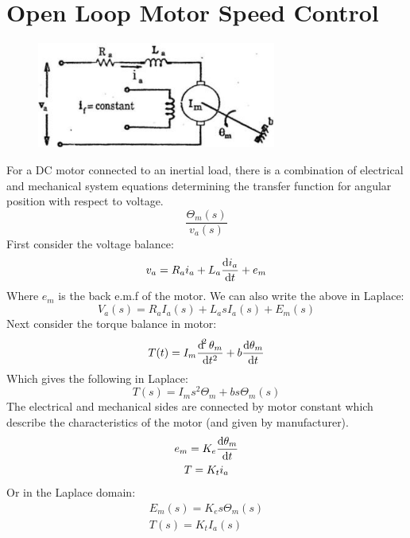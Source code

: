 \documentclass[class=report, crop=false, 12pt,a4paper, tikz, border=4mm]{standalone}
\begin{document}
\section{Open Loop Motor Speed Control}
\begin{figure}[H]
  \centering
  \includegraphics[width = 0.7\textwidth]{../img/diagram37.png}
\end{figure}
For a DC motor connected to an inertial load, there is a combination of electrical and mechanical system equations determining the transfer function for angular position with respect to voltage.
\begin{equation}
  \frac{\Theta_m (s)}{v_a(s)}
\end{equation}
First consider the voltage balance:
\begin{equation}
  v_a = R_a i_a + L_a \frac{\dif i_a}{\dif t} + e_m
\end{equation}
Where $e_m$ is the back e.m.f of the motor. We can also write the above in Laplace:
\begin{equation}
  V_a(s) = R_a I_a (s) + L_a s I_a (s) + E_m (s)
\end{equation}
Next consider the torque balance in motor:
\begin{equation}
  T(t) = I_m \frac{\dif^2 \theta_m}{\dif t^2} + b \frac{\dif \theta_m}{\dif t}
\end{equation}
Which gives the following in Laplace:
\begin{equation}
  T(s) = I_m s^2 \Theta_m + bs\Theta_m (s)
\end{equation}
The electrical and mechanical sides are connected by motor constant which describe the characteristics of the motor (and given by manufacturer).
\begin{gather}
  e_m = K_e \frac{\dif \theta_m}{\dif t} \\ 
  T = K_t i_a
\end{gather}
Or in the Laplace domain:
\begin{gather}
  E_m (s) = K_e s \Theta_m (s)\\
  T(s) = K_t I_a (s)
\end{gather}
\end{document}

